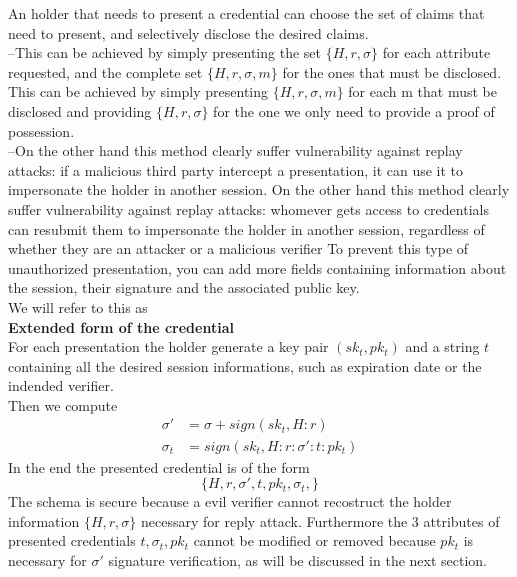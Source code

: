 An holder that needs to present a credential can choose the set of claims that need to present, and selectively disclose the desired claims.\\
{\color{blue}--}This can be achieved by simply presenting the set $\{ H, r, \sigma \}$ for each attribute requested, and the complete set  $\{ H, r, \sigma, m \}$ for the ones that must be disclosed.\\
{\color{blue}This can be achieved by simply presenting $\{ H, r, \sigma, m \}$ for each m that must be disclosed and providing $\{ H, r, \sigma \}$ for the one we only need to provide a proof of possession.\\}
{\color{blue}--}On the other hand this method clearly suffer vulnerability against replay attacks: if a malicious third party intercept a presentation, it can use it to impersonate the holder in another session.
{\color{blue}On the other hand this method clearly suffer vulnerability against replay attacks: whomever gets access to credentials can resubmit them to impersonate the holder in another session, regardless of whether they are an attacker or a malicious verifier}
To prevent this type of unauthorized presentation, you can add more fields containing information about the session, their signature and the associated public key.\\
We will refer to this as\\
\textbf{Extended form of the credential} \\
For each presentation the holder generate a key pair $(sk_t, pk_t)$ and a string $t$ containing all the desired session informations, such as expiration date or the indended verifier.\\
Then we compute
\begin{equation*}
    \begin{split}
        \sigma' &= \sigma + sign(sk_t, H : r) \\
        \sigma_{t} &= sign(sk_t, H : r : \sigma' : t : pk_t)
    \end{split}
\end{equation*}
In the end the presented credential is of the form
\begin{equation*}
    \{H, r, \sigma', t, pk_t,  \sigma_t,\}
\end{equation*}
The schema is secure because a evil verifier cannot recostruct the holder information $\{H,r,\sigma\}$ necessary for reply attack. Furthermore the 3 attributes of presented credentials $t,\sigma_t, pk_t$ cannot be modified or removed because $pk_t$ is necessary for $\sigma'$ signature verification, as will be discussed in the next section.

